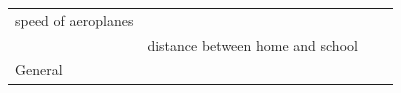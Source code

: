 {\begin{tabular}[t]{|l|l|l|l|}
    
        speed of aeroplanes &
    
    
         &
    
    
     \tabularnewline\cline{1-1}\cline{2-2}\cline{3-3}\cline{4-4}
    
    
         &
    
    
        distance between home and school &
    
    
         &
    
    
     \tabularnewline\cline{1-1}\cline{2-2}\cline{3-3}\cline{4-4}
    
    
        General &
    

\end{tabular}}
